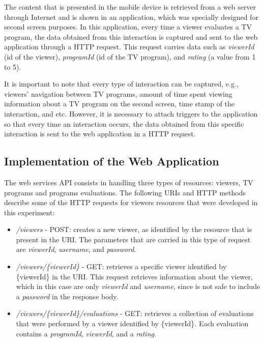 \documentclass[journal]{IEEEtran}
\begin{document}
The content that is presented in the mobile device is retrieved from a web server through Internet and is shown in an application, which was specially designed for second screen purposes. In this application, every time a viewer evaluates a TV program, the data obtained from this interaction is captured and sent to the web application through a HTTP request. This request carries data such as \emph{viewerId} (id of the viewer), \emph{programId} (id of the TV program), and \emph{rating} (a value from 1 to 5).

It is important to note that every type of interaction can be captured, e.g., viewers' navigation between TV programs, amount of time spent viewing information about a TV program on the second screen, time stamp of the interaction, and etc. However, it is necessary to attach triggers to the application so that every time an interaction occurs, the data obtained from this specific interaction is sent to the web application in a HTTP request.

\subsection{Implementation of the Web Application}

The web services API consists in handling three types of resources: viewers, TV programs and programs evaluations. The following URIs and HTTP methods describe some of the HTTP requests for viewers resources that were developed in this experiment:

\begin{itemize}
	\item \emph{/viewers} - POST: creates a new viewer, as identified by the resource that is present in the URI. The parameters that are carried in this type of request are \emph{viewerId}, \emph{username}, and \emph{password}.
	\item \emph{/viewers/\{viewerId\}} - GET: retrieves a specific viewer identified by \{viewerId\} in the URI. This request retrieves information about the viewer, which in this case are only \emph{viewerId} and \emph{username}, since is not safe to include a \emph{password} in the response body.
	\item \emph{/viewers/\{viewerId\}/evaluations} - GET: retrieves a collection of evaluations that were performed by a viewer identified by \{viewerId\}. Each evaluation contains a \emph{programId}, \emph{viewerId}, and a \emph{rating}.
\end{itemize}
\end{document}
